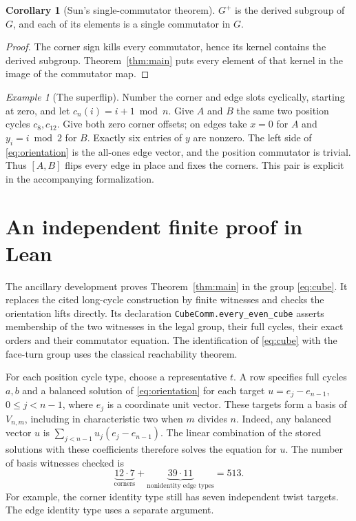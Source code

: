 \documentclass[11pt,letterpaper]{article}
\theoremstyle{definition}
\newtheorem{corollary}[theorem]{Corollary}
\theoremstyle{remark}
\newtheorem{example}[theorem]{Example}
\newcommand{\cl}[2]{[#1,#2]}
\begin{document}
\begin{corollary}[Sun's single-commutator theorem]
\(G^+\) is the derived subgroup of \(G\), and each of its elements is
a single commutator in \(G\).
\end{corollary}
\begin{proof}
The corner sign kills every commutator, hence its kernel contains the
derived subgroup. Theorem~\ref{thm:main} puts every element of that
kernel in the image of the commutator map.
\end{proof}

\begin{example}[The superflip]\label{ex:superflip}
Number the corner and edge slots cyclically, starting at zero, and let
\(c_n(i)=i+1\bmod n\). Give \(A\) and \(B\) the same two position cycles
\(c_8,c_{12}\). Give both zero corner offsets; on edges take \(x=0\)
for \(A\) and \(y_i=i\bmod2\) for \(B\). Exactly six entries of \(y\)
are nonzero. The left side of \eqref{eq:orientation} is the all-ones
edge vector, and the position commutator is trivial. Thus \(\cl{A}{B}\)
flips every edge in place and fixes the corners. This pair is explicit
in the accompanying formalization.
\end{example}

\section{An independent finite proof in Lean}\label{sec:cert}

The ancillary development proves Theorem~\ref{thm:main} in the group
\eqref{eq:cube}. It replaces the cited long-cycle construction by
finite witnesses and checks the orientation lifts directly. Its
declaration \texttt{CubeComm.every\_even\_cube} asserts membership of the
two witnesses in the legal group, their full cycles, their exact orders
and their commutator equation. The identification of \eqref{eq:cube}
with the face-turn group uses the classical reachability theorem.

For each position cycle type, choose a representative \(t\). A row
specifies full cycles \(a,b\) and a balanced solution of
\eqref{eq:orientation} for each target \(u=e_j-e_{n-1}\),
\(0\le j<n-1\), where \(e_j\) is a coordinate unit vector. These targets
form a basis of \(V_{n,m}\), including in characteristic two when \(m\)
divides \(n\). Indeed, any balanced vector \(u\) is
\(\sum_{j<n-1}u_j(e_j-e_{n-1})\). The linear combination of the stored
solutions with these coefficients therefore solves the equation for \(u\).
The number of basis witnesses checked is
\[
   \underbrace{12\cdot7}_{\text{corners}}+
   \underbrace{39\cdot11}_{\text{nonidentity edge types}}=513.
\]
For example, the corner identity type still has seven independent
twist targets. The edge identity type uses a separate argument.
\end{document}
